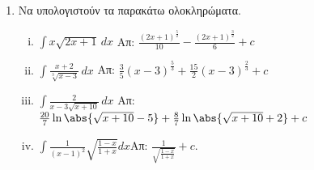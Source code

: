 




\begin{center}
\end{center}

\vspace{2\baselineskip}
\everymath{\displaystyle}
\pagestyle{empty}

\begin{enumerate}

\item Να υπολογιστούν τα παρακάτω ολοκληρώματα.

\begin{enumerate}[i)]
\item $\int x\sqrt{2x+1}\,dx$ \hfill Απ: $\frac{(2x+1)^{\frac{5}{2}}}{10}-\frac{(2x+1)^{\frac{3}{2}}}{6}+c$
\item $\int\frac{x+2}{\sqrt[3]{x-3}}\,dx$ \hfill Απ: $\frac{3}{5}(x-3)^{\frac{5}{3}}+\frac{15}{2}(x-3)^{\frac{2}{3}}+c$
\item $\int\frac{2}{x-3\sqrt{x+10}}\,dx$ \hfill Απ: $\frac{20}{7}\ln\abs{\sqrt{x+10}-5}+\frac{8}{7}\ln\abs{\sqrt{x+10}+2}+c$
\item $\int\frac{1}{(x-1)^2}\sqrt{\frac{1-x}{1+x}}dx$\hfill Απ: $\frac{1}{\sqrt{\frac{1-x}{1+x}}}+c$.
\end{enumerate}

\end{enumerate}


